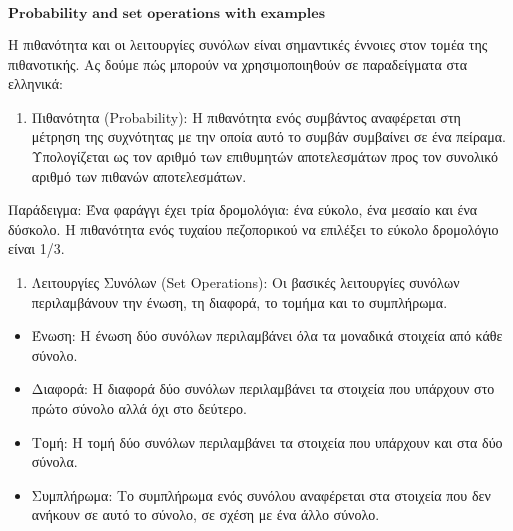 \documentclass[11pt]{article}
\makeatletter
\providecommand{\tightlist}{%
      \setlength{\itemsep}{0pt}\setlength{\parskip}{0pt}}
\newcommand{\boxspacing}{\kern\kvtcb@left@rule\kern\kvtcb@boxsep}
\newcommand{\prompt}[4]{
        {\ttfamily\llap{{\color{#2}[#3]:\hspace{3pt}#4}}\vspace{-\baselineskip}}
    }
\makeatother
\begin{document}
    \begin{tcolorbox}[breakable, size=fbox, boxrule=1pt, pad at break*=1mm,colback=cellbackground, colframe=cellborder]
\prompt{In}{incolor}{ }{\boxspacing}
\begin{Verbatim}[commandchars=\\\{\}]

\end{Verbatim}
\end{tcolorbox}

    \(\textbf{Probability and set operations with examples}\)

    Η πιθανότητα και οι λειτουργίες συνόλων είναι σημαντικές έννοιες στον
τομέα της πιθανοτικής. Ας δούμε πώς μπορούν να χρησιμοποιηθούν σε
παραδείγματα στα ελληνικά:

\begin{enumerate}
\def\labelenumi{\arabic{enumi}.}
\tightlist
\item
  Πιθανότητα (Probability): Η πιθανότητα ενός συμβάντος αναφέρεται στη
  μέτρηση της συχνότητας με την οποία αυτό το συμβάν συμβαίνει σε ένα
  πείραμα. Υπολογίζεται ως τον αριθμό των επιθυμητών αποτελεσμάτων προς
  τον συνολικό αριθμό των πιθανών αποτελεσμάτων.
\end{enumerate}

Παράδειγμα: Ένα φαράγγι έχει τρία δρομολόγια: ένα εύκολο, ένα μεσαίο και
ένα δύσκολο. Η πιθανότητα ενός τυχαίου πεζοπορικού να επιλέξει το εύκολο
δρομολόγιο είναι 1/3.

\begin{enumerate}
\def\labelenumi{\arabic{enumi}.}
\setcounter{enumi}{1}
\tightlist
\item
  Λειτουργίες Συνόλων (Set Operations): Οι βασικές λειτουργίες συνόλων
  περιλαμβάνουν την ένωση, τη διαφορά, το τομήμα και το συμπλήρωμα.
\end{enumerate}

\begin{itemize}
\tightlist
\item
  Ένωση: Η ένωση δύο συνόλων περιλαμβάνει όλα τα μοναδικά στοιχεία από
  κάθε σύνολο.
\item
  Διαφορά: Η διαφορά δύο συνόλων περιλαμβάνει τα στοιχεία που υπάρχουν
  στο πρώτο σύνολο αλλά όχι στο δεύτερο.
\item
  Τομή: Η τομή δύο συνόλων περιλαμβάνει τα στοιχεία που υπάρχουν και στα
  δύο σύνολα.
\item
  Συμπλήρωμα: Το συμπλήρωμα ενός συνόλου αναφέρεται στα στοιχεία που δεν
  ανήκουν σε αυτό το σύνολο, σε σχέση με ένα άλλο σύνολο.
\end{itemize}
\end{document}
